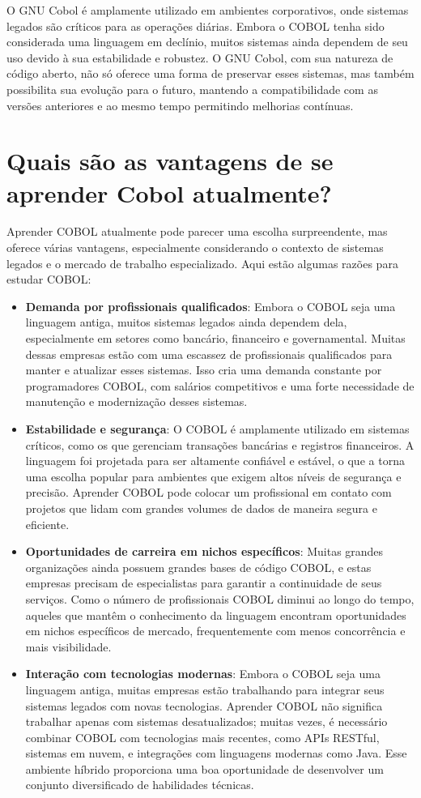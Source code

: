 O GNU Cobol é amplamente utilizado em ambientes corporativos, onde sistemas legados são críticos para as operações diárias. Embora o COBOL tenha sido considerada uma linguagem em declínio, muitos sistemas ainda dependem de seu uso devido à sua estabilidade e robustez. O GNU Cobol, com sua natureza de código aberto, não só oferece uma forma de preservar esses sistemas, mas também possibilita sua evolução para o futuro, mantendo a compatibilidade com as versões anteriores e ao mesmo tempo permitindo melhorias contínuas.

\section{Quais são as vantagens de se aprender Cobol atualmente?}
Aprender COBOL atualmente pode parecer uma escolha surpreendente, mas oferece várias vantagens, especialmente considerando o contexto de sistemas legados e o mercado de trabalho especializado. Aqui estão algumas razões para estudar COBOL:
\begin{itemize}
	\item \textbf{Demanda por profissionais qualificados}: Embora o COBOL seja uma linguagem antiga, muitos sistemas legados ainda dependem dela, especialmente em setores como bancário, financeiro e governamental. Muitas dessas empresas estão com uma escassez de profissionais qualificados para manter e atualizar esses sistemas. Isso cria uma demanda constante por programadores COBOL, com salários competitivos e uma forte necessidade de manutenção e modernização desses sistemas.
	\item \textbf{Estabilidade e segurança}: O COBOL é amplamente utilizado em sistemas críticos, como os que gerenciam transações bancárias e registros financeiros. A linguagem foi projetada para ser altamente confiável e estável, o que a torna uma escolha popular para ambientes que exigem altos níveis de segurança e precisão. Aprender COBOL pode colocar um profissional em contato com projetos que lidam com grandes volumes de dados de maneira segura e eficiente.
	\item \textbf{Oportunidades de carreira em nichos específicos}: Muitas grandes organizações ainda possuem grandes bases de código COBOL, e estas empresas precisam de especialistas para garantir a continuidade de seus serviços. Como o número de profissionais COBOL diminui ao longo do tempo, aqueles que mantêm o conhecimento da linguagem encontram oportunidades em nichos específicos de mercado, frequentemente com menos concorrência e mais visibilidade.
	\item \textbf{Interação com tecnologias modernas}: Embora o COBOL seja uma linguagem antiga, muitas empresas estão trabalhando para integrar seus sistemas legados com novas tecnologias. Aprender COBOL não significa trabalhar apenas com sistemas desatualizados; muitas vezes, é necessário combinar COBOL com tecnologias mais recentes, como APIs RESTful, sistemas em nuvem, e integrações com linguagens modernas como Java. Esse ambiente híbrido proporciona uma boa oportunidade de desenvolver um conjunto diversificado de habilidades técnicas.
\end{itemize}
